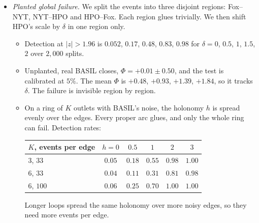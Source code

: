 \documentclass[11pt]{article}
\theoremstyle{definition}
\theoremstyle{remark}
\begin{document}
\begin{itemize}
\begin{itemize}
    \item In 2017--19, HPO--NYT gives $p=0.00025$ (Bonferroni $0.006$). HPO had $0$ of $94$ Republican-directed spans positive, against $6$ of $17$ Democratic-directed.
    \item Excluding Trump as a target, Fox--HPO persists: $\Phi=+1.09$, $p=0.015$, CI $[+0.10,+2.18]$. The two outlets are then selective in opposite directions. Fox's favourability log-odds are $-1.46$ toward R and $-2.11$ toward D; HPO's are $-0.99$ toward D and $-1.44$ toward R. Most of the 2017--19 HPO effect is Trump-specific: without Trump, Fox--HPO 2017--19 has $p=0.25$, while HPO--NYT still has $p=0.01$.
    \item Each party alone glues; only their union fails. This is a genuine global failure.
  \end{itemize}
  \item \emph{Planted global failure.} We split the events into three disjoint regions: Fox--NYT, NYT--HPO and HPO--Fox. Each region glues trivially. We then shift HPO's scale by $\delta$ in one region only.
  \begin{itemize}
    \item Detection at $|z|>1.96$ is $0.052$, $0.17$, $0.48$, $0.83$, $0.98$ for $\delta=0$, $0.5$, $1$, $1.5$, $2$ over $2{,}000$ splits.
    \item Unplanted, real BASIL closes, $\Phi=+0.01\pm0.50$, and the test is calibrated at $5\%$. The mean $\Phi$ is $+0.48$, $+0.93$, $+1.39$, $+1.84$, so it tracks $\delta$. The failure is invisible region by region.
    \item On a ring of $K$ outlets with BASIL's noise, the holonomy $h$ is spread evenly over the edges. Every proper arc glues, and only the whole ring can fail. Detection rates:
  \begin{center}\small
  \begin{tabular}{lccccc}
  \toprule
  $K$, events per edge & $h=0$ & $0.5$ & $1$ & $2$ & $3$\\
  \midrule
  $3$, $33$ & $0.05$ & $0.18$ & $0.55$ & $0.98$ & $1.00$\\
  $6$, $33$ & $0.04$ & $0.11$ & $0.31$ & $0.81$ & $0.98$\\
  $6$, $100$ & $0.06$ & $0.25$ & $0.70$ & $1.00$ & $1.00$\\
  \bottomrule
  \end{tabular}
  \end{center}
  Longer loops spread the same holonomy over more noisy edges, so they need more events per edge.
  \end{itemize}
\end{itemize}
\end{document}
